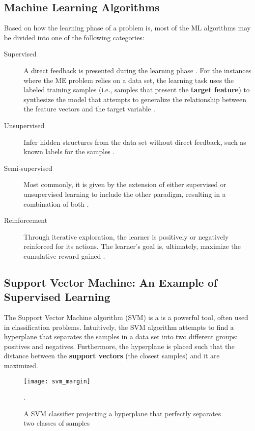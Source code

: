 \subsection{Machine Learning Algorithms}

Based on how the learning phase of a problem is, most of the ML algorithms may be divided into one of the following categories:

\begin{description}
	\item[Supervised] A direct feedback is presented during the learning phase \cite{pat1996}. For the instances where the ME problem relies on a data set, the learning task uses the labeled training samples (i.e., samples that present the \textbf{target feature}) to synthesize the model that attempts to generalize the relationship between the feature vectors and the target variable \cite{awa2015}.

	\item[Unsupervised] Infer hidden structures from the data set without direct feedback, such as known labels for the samples \cite{awa2015}.

	\item[Semi-supervised] Most commonly, it is given by the extension of either supervised or unsupervised learning to include the other paradigm, resulting in a combination of both \cite{zhu2009}.

	\item[Reinforcement] Through iterative exploration, the learner is positively or negatively reinforced for its actions. The learner's goal is, ultimately, maximize the cumulative reward gained \cite{awa2015}.
\end{description}

\subsection{Support Vector Machine: An Example of Supervised Learning}

The Support Vector Machine algorithm (SVM) is a is a powerful tool, often used in classification problems. Intuitively, the SVM algorithm attempts to find a hyperplane that separates the samples in a data set into two different groups: positives and negatives. Furthermore, the hyperplane is placed such that the distance between the \textbf{support vectors} (the closest samples) and it are maximized.

\begin{figure}[H]
	\centering
	\captionsetup{justification=centering}

	\texttt{[image: svm\_margin]}
	\caption{A SVM classifier projecting a hyperplane that perfectly separates two classes of samples \cite{sksvm}}.
	\label{fig:svmmargin}
\end{figure}


